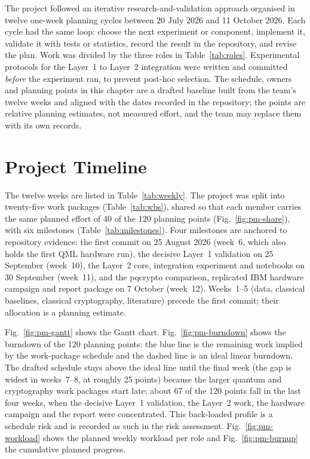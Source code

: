 The project followed an iterative research-and-validation approach organised in twelve one-week planning cycles between 20 July 2026 and 11 October 2026. Each cycle had the same loop: choose the next experiment or component, implement it, validate it with tests or statistics, record the result in the repository, and revise the plan. Work was divided by the three roles in Table~\ref{tab:roles}. Experimental protocols for the Layer~1 to Layer~2 integration were written and committed \emph{before} the experiment ran, to prevent post-hoc selection. The schedule, owners and planning points in this chapter are a drafted baseline built from the team's twelve weeks and aligned with the dates recorded in the repository; the points are relative planning estimates, not measured effort, and the team may replace them with its own records.

\section{Project Timeline}
The twelve weeks are listed in Table~\ref{tab:weekly}. The project was split into twenty-five work packages (Table~\ref{tab:wbs}), shared so that each member carries the same planned effort of 40 of the 120 planning points (Fig.~\ref{fig:pm-share}), with six milestones (Table~\ref{tab:milestones}). Four milestones are anchored to repository evidence: the first commit on 25 August 2026 (week~6, which also holds the first  QML hardware run), the decisive Layer~1 validation on 25 September (week~10), the Layer~2 core, integration experiment and notebooks on 30 September (week~11), and the pqcrypto comparison, replicated IBM hardware campaign and report package on 7 October (week~12). Weeks~1--5 (data, classical baselines, classical cryptography, literature) precede the first commit; their allocation is a planning estimate.

Fig.~\ref{fig:pm-gantt} shows the Gantt chart. Fig.~\ref{fig:pm-burndown} shows the burndown of the 120 planning points: the blue line is the remaining work implied by the work-package schedule and the dashed line is an ideal linear burndown. The drafted schedule stays above the ideal line until the final week (the gap is widest in weeks~7--8, at roughly 25 points) because the larger quantum and cryptography work packages start late; about 67 of the 120 points fall in the last four weeks, when the decisive Layer~1 validation, the Layer~2 work, the hardware campaign and the report were concentrated. This back-loaded profile is a schedule risk and is recorded as such in the risk assessment. Fig.~\ref{fig:pm-workload} shows the planned weekly workload per role and Fig.~\ref{fig:pm-burnup} the cumulative planned progress.

